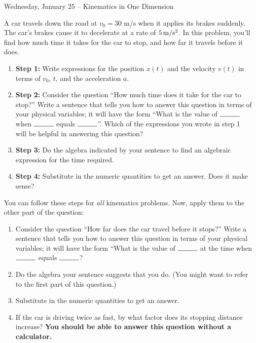 \documentclass[12pt]{article}
\newcommand{\vs}[1]{\vspace{#1}}
\newcommand{\BC}{\begin{center}}
\newcommand{\EC}{\end{center}}
\begin{document}
\Large
\centerline{}
\large
\BC
\sc
Wednesday, January 25 -- Kinematics in One Dimension
\EC
\normalsize

A car travels down the road at $v_0=30$ m/s when it applies its brakes suddenly. The car's brakes cause it to
decelerate at a rate of $\rm 5\, m/\rm s^2$. In this problem, you'll find
how much time it takes for the car to stop, and how far it travels before it 
does.




\begin{enumerate}
\item {\bf Step 1:} Write expressions for the position $x(t)$ and the velocity $v(t)$ in terms
of $v_0$, $t$, and the acceleration $a$. 

\vs{1in}

\item {\bf Step 2:} Consider the question ``How much time does it take for the
car to stop?'' Write a sentence that tells you how to answer this question
in terms of your physical variables; it will have the form ``What is the 
value of $\rule{1cm}{0.15mm}$ when $\rule{1cm}{0.15mm}$ equals $\rule{1cm}{0.15mm}$''. Which of the expressions you wrote in step 1 will be helpful in 
answering this question?

\vs{1.5in}

\item {\bf Step 3:} Do the algebra indicated by your sentence to find an
algebraic expression for the time required.

\vs{1.5in}

\item {\bf Step 4:} Substitute in the numeric quantities to get an answer. Does it make sense?

\vs{1in}

\end{enumerate}

You can follow these steps for {\it all} kinematics problems. Now, apply them
to the other part of the question:

\begin{enumerate}
\item Consider the question ``How far does the car travel before it stops?'' 
 Write a sentence that tells you how to answer this question
in terms of your physical variables; it will have the form ``What is the
value of $\rule{1cm}{0.15mm}$ at the time when $\rule{1cm}{0.15mm}$
equals $\rule{1cm}{0.15mm}$?

\vs{1.5in}

\item Do the algebra your sentence suggests that you do. (You might want to 
refer to the first part of this question.)

\vs{1.5in}

\item Substitute in the numeric quantities to get an answer.

\vs{1in}

\item If the car is driving twice as fast, by what factor does its stopping
distance increase? {\bf You should be able to answer this question without
a calculator.}
\end{enumerate}
\end{document}
